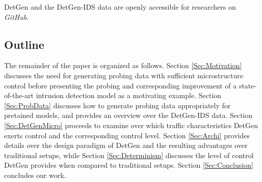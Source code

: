 \documentclass[runningheads]{llncs}
\begin{document}
%
%
%
%
%
%


DetGen and the DetGen-IDS data are openly accessible for researchers on \textit{GitHub}.


\subsection{Outline}

The remainder of the paper is organized as follows. Section \ref{Sec:Motivation} discusses the need for generating probing data with sufficient microstructure control before presenting the probing and corresponding improvement of a state-of-the-art intrusion detection model as a motivating example. Section \ref{Sec:ProbData} discusses how to generate probing data appropriately for pretained models, and provides an overview over the DetGen-IDS data.
Section \ref{Sec:DetGenMicro} proceeds to examine over which traffic characteristics DetGen exerts control and the corresponding control level.
Section \ref{Sec:Archi} provides details over the design paradigm of DetGen and the resulting advantages over traditional setups, while Section \ref{Sec:Determinism} discusses the level of control DetGen provides when compared to traditional setups.
 Section \ref{Sec:Conclusion} concludes our work.
\end{document}

